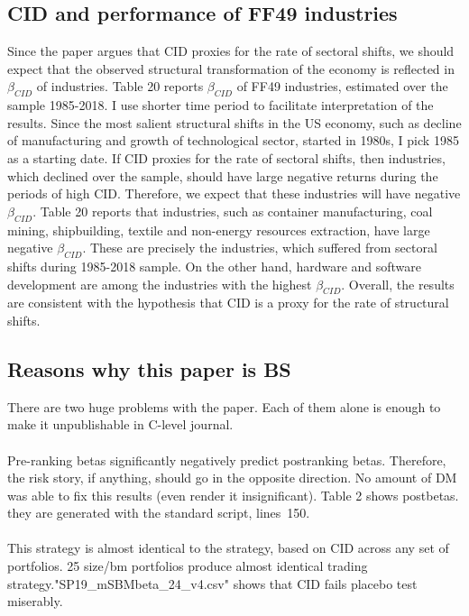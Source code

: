 \documentclass[12pt]{article}
\begin{document}
\subsection{CID and performance of FF49 industries}
Since the paper argues that CID proxies for the rate of sectoral shifts, we should expect that the observed structural transformation of the economy is reflected in $\beta_{CID}$ of industries. Table 20 reports $\beta_{CID}$ of FF49 industries, estimated over the sample 1985-2018. I use shorter time period to facilitate interpretation of the results. Since the most salient structural shifts in the US economy, such as decline of manufacturing and growth of technological sector, started in 1980s, I pick 1985 as a starting date. If CID proxies for the rate of sectoral shifts, then industries, which declined over the sample, should have large negative returns during the periods of high CID. Therefore, we expect that these industries will have negative $\beta_{CID}$. Table 20 reports that industries, such as container manufacturing, coal mining, shipbuilding, textile and non-energy resources extraction, have large negative $\beta_{CID}$. These are precisely the industries, which suffered from sectoral shifts during 1985-2018 sample. On the other hand, hardware and software development are among the industries with the highest $\beta_{CID}$. Overall, the results are consistent with the hypothesis that CID is a proxy for the rate of structural shifts.


\subsection{Reasons why this paper is BS}
There are two huge problems with the paper. Each of them alone is enough to make it unpublishable in C-level journal.
\paragraph{}
Pre-ranking betas significantly negatively predict postranking betas. Therefore, the risk story, if anything, should go in the opposite direction. No amount of DM was able to fix this results (even render it insignificant). Table 2 shows postbetas. they are generated with the standard script, lines~150.
\paragraph{}
This strategy is almost identical to the strategy, based on CID across any set of portfolios. 25 size/bm portfolios produce almost identical trading strategy."SP19_mSBMbeta_24_v4.csv" shows that CID fails placebo test miserably.
\end{document}
